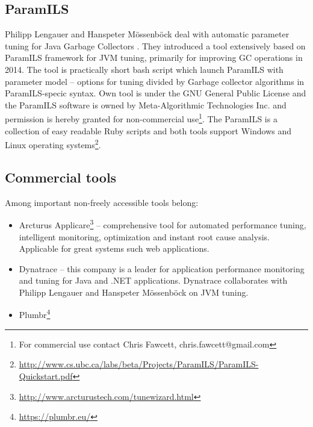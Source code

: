 \documentclass[
  digital, %
  oneside,
  notable, %
  nolof,     %
  nolot     %
]{fithesis3}
\begin{document}
\subsection{ParamILS}
Philipp Lengauer and Hanspeter Mössenböck deal with automatic parameter tuning for Java Garbage Collectors \cite{jvmtuner}. They introduced a tool extensively based on ParamILS framework for JVM tuning, primarily for improving GC operations in 2014. The tool is practically short bash script which launch ParamILS with parameter model -- options for tuning divided by Garbage collector algorithms in ParamILS-specic syntax. Own tool is under the GNU General Public License and the ParamILS software is owned by Meta-Algorithmic Technologies Inc. and permission is hereby granted for non-commercial use\footnote{For commercial use contact Chris Fawcett, chris.fawcett@gmail.com}. \cite{jvmtuner} \cite{paramils} The ParamILS is a collection of easy readable Ruby scripts and both tools support Windows and Linux operating systems\footnote{\url{http://www.cs.ubc.ca/labs/beta/Projects/ParamILS/ParamILS-Quickstart.pdf}}. 




\subsection{Commercial tools}
Among important non-freely accessible tools belong:
\begin{itemize}
	\item Arcturus Applicare\footnote{\url{http://www.arcturustech.com/tunewizard.html}} -- comprehensive tool for automated performance tuning, intelligent monitoring, optimization and instant root cause analysis. Applicable for great systems such web applications.
	\item Dynatrace -- this company is a leader for application performance monitoring and tuning for Java and .NET applications. Dynatrace collaborates with Philipp Lengauer and Hanspeter Mössenböck on JVM tuning. \cite{jvmtuner-boost}
	\item Plumbr\footnote{\url{https://plumbr.eu/}}
\end{itemize}
\end{document}
